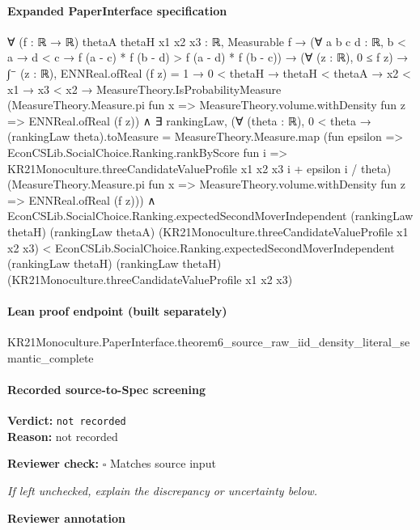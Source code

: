 \documentclass[10pt]{article}
\newcommand{\reviewerbox}{%
  \par\noindent\fbox{\parbox{0.96\linewidth}{\rule{0pt}{0.38in}}}\par
}
\newcommand{\reviewmatch}[1]{%
  \par\noindent\textbf{Reviewer check:} $\square$\; #1\par
  \noindent\emph{If left unchecked, explain the discrepancy or uncertainty below.}\par
}
\begin{document}
\paragraph{Expanded PaperInterface specification}
\begin{ReviewVerbatim}
∀ (f : ℝ → ℝ) {thetaA thetaH x1 x2 x3 : ℝ},
  Measurable f →
    (∀ {{a b c d : ℝ}}, b < a → d < c → f (a - c) * f (b - d) > f (a - d) * f (b - c)) →
      (∀ (z : ℝ), 0 ≤ f z) →
        ∫⁻ (z : ℝ), ENNReal.ofReal (f z) = 1 →
          0 < thetaH →
            thetaH < thetaA →
              x2 < x1 →
                x3 < x2 →
                  MeasureTheory.IsProbabilityMeasure
                      (MeasureTheory.Measure.pi fun x =>
                        MeasureTheory.volume.withDensity fun z => ENNReal.ofReal (f z)) ∧
                    ∃ rankingLaw,
                      (∀ (theta : ℝ),
                          0 < theta →
                            (rankingLaw theta).toMeasure =
                              MeasureTheory.Measure.map
                                (fun epsilon =>
                                  EconCSLib.SocialChoice.Ranking.rankByScore fun i =>
                                    KR21Monoculture.threeCandidateValueProfile x1 x2 x3 i + epsilon i / theta)
                                (MeasureTheory.Measure.pi fun x =>
                                  MeasureTheory.volume.withDensity fun z => ENNReal.ofReal (f z))) ∧
                        EconCSLib.SocialChoice.Ranking.expectedSecondMoverIndependent (rankingLaw thetaH)
                            (rankingLaw thetaA) (KR21Monoculture.threeCandidateValueProfile x1 x2 x3) <
                          EconCSLib.SocialChoice.Ranking.expectedSecondMoverIndependent (rankingLaw thetaH)
                            (rankingLaw thetaH) (KR21Monoculture.threeCandidateValueProfile x1 x2 x3)
\end{ReviewVerbatim}

\paragraph{Lean proof endpoint (built separately)}\begin{ReviewVerbatim}
KR21Monoculture.PaperInterface.theorem6_source_raw_iid_density_literal_semantic_complete
\end{ReviewVerbatim}

\paragraph{Recorded source-to-Spec screening}
\textbf{Verdict:} \texttt{not recorded}
\\
\textbf{Reason:} not recorded
\reviewmatch{Matches source input}
\noindent\textbf{Reviewer annotation}\par
\reviewerbox
\clearpage
\hypertarget{source-claim-d7ed4659ca9b332e}{}
\end{document}

